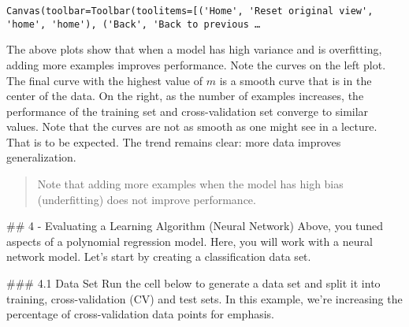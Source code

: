 \documentclass[11pt]{article}
\begin{document}
    
    \begin{verbatim}
Canvas(toolbar=Toolbar(toolitems=[('Home', 'Reset original view', 'home', 'home'), ('Back', 'Back to previous …
    \end{verbatim}

    
    The above plots show that when a model has high variance and is
overfitting, adding more examples improves performance. Note the curves
on the left plot. The final curve with the highest value of \(m\) is a
smooth curve that is in the center of the data. On the right, as the
number of examples increases, the performance of the training set and
cross-validation set converge to similar values. Note that the curves
are not as smooth as one might see in a lecture. That is to be expected.
The trend remains clear: more data improves generalization.

\begin{quote}
Note that adding more examples when the model has high bias
(underfitting) does not improve performance.
\end{quote}

    \#\# 4 - Evaluating a Learning Algorithm (Neural Network) Above, you
tuned aspects of a polynomial regression model. Here, you will work with
a neural network model. Let's start by creating a classification data
set.

    \#\#\# 4.1 Data Set Run the cell below to generate a data set and split
it into training, cross-validation (CV) and test sets. In this example,
we're increasing the percentage of cross-validation data points for
emphasis.
\end{document}
